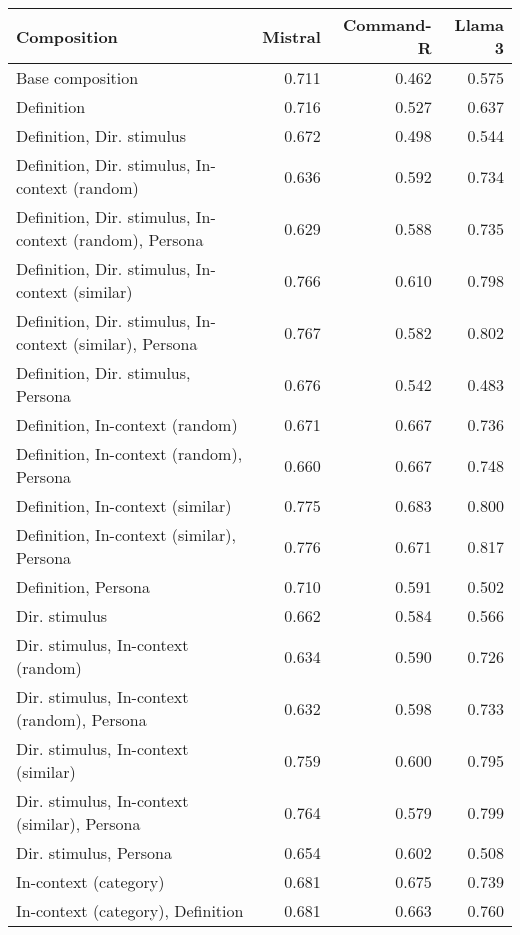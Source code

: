 \begin{table*}
    \small
    \centering
    \begin{tabular}{lrrr}
        \toprule
        \textbf{Composition} & \textbf{Mistral} & \textbf{Command-R} & \textbf{Llama 3} \\
        \midrule
        Base composition & 0.711 & 0.462 & 0.575 \\
        Definition & 0.716 & 0.527 & 0.637 \\
        Definition, Dir. stimulus & 0.672 & 0.498 & 0.544 \\
        Definition, Dir. stimulus, In-context (random) & 0.636 & 0.592 & 0.734 \\
        Definition, Dir. stimulus, In-context (random), Persona & 0.629 & 0.588 & 0.735 \\
        Definition, Dir. stimulus, In-context (similar) & 0.766 & 0.610 & 0.798 \\
        Definition, Dir. stimulus, In-context (similar), Persona & 0.767 & 0.582 & 0.802 \\
        Definition, Dir. stimulus, Persona & 0.676 & 0.542 & 0.483 \\
        Definition, In-context (random) & 0.671 & 0.667 & 0.736 \\
        Definition, In-context (random), Persona & 0.660 & 0.667 & 0.748 \\
        Definition, In-context (similar) & 0.775 & 0.683 & 0.800 \\
        Definition, In-context (similar), Persona & 0.776 & 0.671 & 0.817 \\
        Definition, Persona & 0.710 & 0.591 & 0.502 \\
        Dir. stimulus & 0.662 & 0.584 & 0.566 \\
        Dir. stimulus, In-context (random) & 0.634 & 0.590 & 0.726 \\
        Dir. stimulus, In-context (random), Persona & 0.632 & 0.598 & 0.733 \\
        Dir. stimulus, In-context (similar) & 0.759 & 0.600 & 0.795 \\
        Dir. stimulus, In-context (similar), Persona & 0.764 & 0.579 & 0.799 \\
        Dir. stimulus, Persona & 0.654 & 0.602 & 0.508 \\
        In-context (category) & 0.681 & 0.675 & 0.739 \\
        In-context (category), Definition & 0.681 & 0.663 & 0.760 \\

\end{tabular}
\end{table*}
